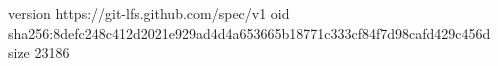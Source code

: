 version https://git-lfs.github.com/spec/v1
oid sha256:8defc248c412d2021e929ad4d4a653665b18771c333cf84f7d98cafd429c456d
size 23186
